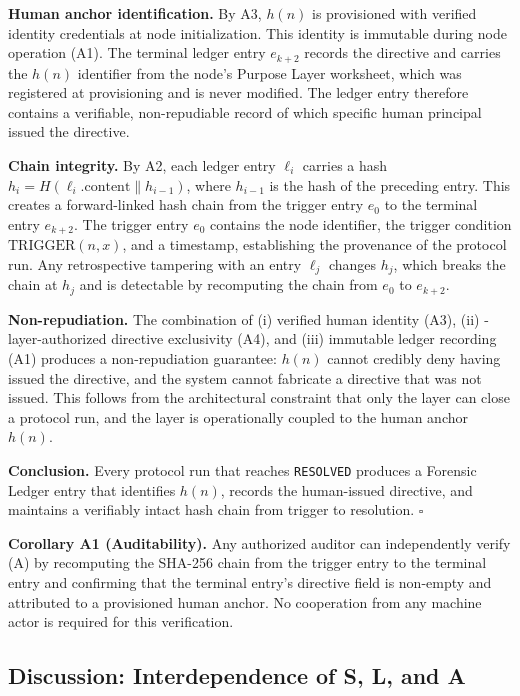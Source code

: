 \textbf{Human anchor identification.} By A3, $h(n)$ is provisioned with verified identity credentials at node initialization. This identity is immutable during node operation (A1). The terminal ledger entry $e_{k+2}$ records the directive and carries the $h(n)$ identifier from the node's Purpose Layer worksheet, which was registered at provisioning and is never modified. The ledger entry therefore contains a verifiable, non-repudiable record of which specific human principal issued the directive.

\textbf{Chain integrity.} By A2, each ledger entry $\ell_i$ carries a hash $h_i = H(\ell_i.\text{content} \| h_{i-1})$, where $h_{i-1}$ is the hash of the preceding entry. This creates a forward-linked hash chain from the trigger entry $e_0$ to the terminal entry $e_{k+2}$. The trigger entry $e_0$ contains the node identifier, the trigger condition $\text{TRIGGER}(n, x)$, and a timestamp, establishing the provenance of the protocol run. Any retrospective tampering with an entry $\ell_j$ changes $h_j$, which breaks the chain at $h_j$ and is detectable by recomputing the chain from $e_0$ to $e_{k+2}$.

\textbf{Non-repudiation.} The combination of (i) verified human identity (A3), (ii) \purpose-layer-authorized directive exclusivity (A4), and (iii) immutable ledger recording (A1) produces a non-repudiation guarantee: $h(n)$ cannot credibly deny having issued the directive, and the system cannot fabricate a directive that was not issued. This follows from the architectural constraint that only the \purpose{} layer can close a protocol run, and the \purpose{} layer is operationally coupled to the human anchor $h(n)$.

\textbf{Conclusion.} Every protocol run that reaches \texttt{RESOLVED} produces a Forensic Ledger entry that identifies $h(n)$, records the human-issued directive, and maintains a verifiably intact hash chain from trigger to resolution. $\square$

\bigskip
\noindent\textbf{Corollary A1 (Auditability).} Any authorized auditor can independently verify (A) by recomputing the SHA-256 chain from the trigger entry to the terminal entry and confirming that the terminal entry's directive field is non-empty and attributed to a provisioned human anchor. No cooperation from any machine actor is required for this verification.

\subsection{Discussion: Interdependence of S, L, and A}\label{sec:properties-interdependence}

